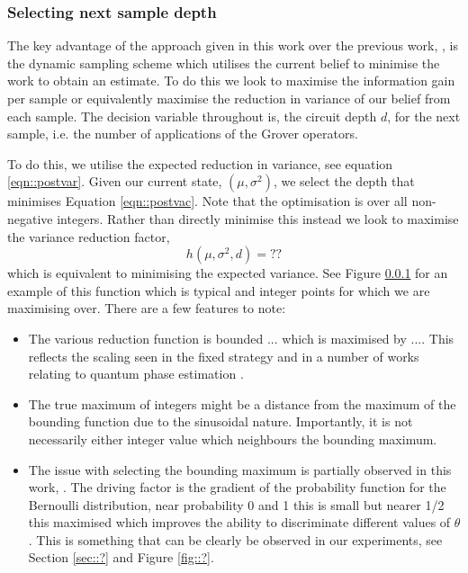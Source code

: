 \subsubsection{Selecting next sample depth}

The key advantage of the approach given in this work over the previous work, \cite{}, is the dynamic sampling scheme which utilises the current belief to minimise the work to obtain an estimate. To do this we look to maximise the information gain per sample or equivalently maximise the reduction in variance of our belief from each sample. The decision variable throughout is, the circuit depth $d$, for the next sample, i.e. the number of applications of the Grover operators.

To do this, we utilise the expected reduction in variance, see equation \ref{eqn::postvar}. Given our current state, $(\mu,\sigma^2)$, we select the depth that minimises Equation \ref{eqn::postvac}. Note that the optimisation is over all non-negative integers. Rather than directly minimise this instead we look to maximise the variance reduction factor,
\begin{equation} h(\mu,\sigma^2,d) =?? \label{eqn::varfactor}\end{equation}
which is equivalent to minimising the expected variance. See Figure \ref{} for an example of this function which is typical and integer points for which we are maximising over. There are a few features to note:
\begin{itemize}
	\item The various reduction function is bounded $...$ which is maximised by $...$. This reflects the scaling seen in the fixed strategy and in a number of works relating to quantum phase estimation \cite{}.
	\item The true maximum of integers might be a distance from the maximum of the bounding function due to the sinusoidal nature. Importantly, it is not necessarily either integer value which neighbours the bounding maximum.
	\item The issue with selecting the bounding maximum is partially observed in this work, \cite{}. The driving factor is the gradient of the probability function for the Bernoulli distribution, near probability 0 and 1 this is small but nearer 1/2 this maximised which improves the ability to discriminate different values of $\theta$. This is something that can be clearly be observed in our experiments, see Section \ref{sec::?} and Figure \ref{fig::?}.
\end{itemize}

